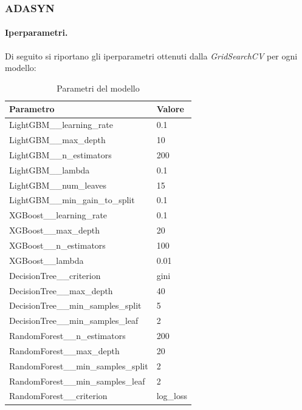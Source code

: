 \subsubsection{ADASYN}
\paragraph{Iperparametri.} Di seguito si riportano gli iperparametri ottenuti dalla \textit{GridSearchCV} per ogni modello:

\begin{table}[H]
    \centering
    \begin{tabular}{|l|l|}
    \toprule
    \textbf{Parametro}                 & \textbf{Valore} \\ \midrule
    LightGBM\_\_learning\_rate            & 0.1             \\ 
    LightGBM\_\_max\_depth                & 10              \\ 
    LightGBM\_\_n\_estimators             & 200             \\ 
    LightGBM\_\_lambda                    & 0.1             \\ 
    LightGBM\_\_num\_leaves               & 15              \\ 
    LightGBM\_\_min\_gain\_to\_split      & 0.1             \\ 
    XGBoost\_\_learning\_rate         & 0.1             \\ 
    XGBoost\_\_max\_depth             & 20              \\ 
    XGBoost\_\_n\_estimators          & 100             \\ 
    XGBoost\_\_lambda                 & 0.01            \\ 
    DecisionTree\_\_criterion         & gini            \\ 
    DecisionTree\_\_max\_depth        & 40              \\ 
    DecisionTree\_\_min\_samples\_split & 5               \\ 
    DecisionTree\_\_min\_samples\_leaf & 2               \\ 
    RandomForest\_\_n\_estimators     & 200             \\ 
    RandomForest\_\_max\_depth        & 20              \\ 
    RandomForest\_\_min\_samples\_split & 2               \\ 
    RandomForest\_\_min\_samples\_leaf & 2               \\ 
    RandomForest\_\_criterion         & log\_loss         \\ \bottomrule
    \end{tabular}
    \caption{Parametri del modello}
    \end{table}


